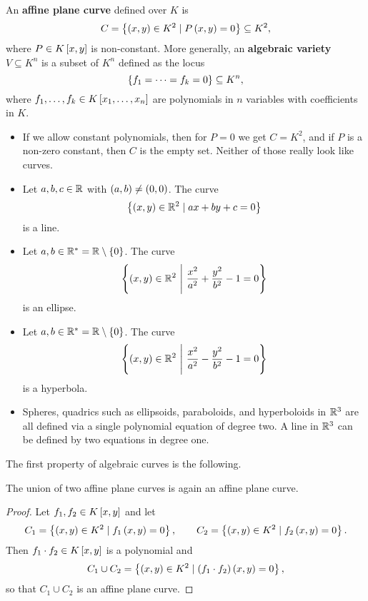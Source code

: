 \begin{definition}
An \textbf{affine plane curve} defined over $ K $ is
$$ C = \cb{\rb{x, y} \in K^2 \mid P\rb{x, y} = 0} \subseteq K^2, $$
where $ P \in K\sb{x, y} $ is non-constant. More generally, an \textbf{algebraic variety} $ V \subseteq K^n $ is a subset of $ K^n $ defined as the locus
$$ \cb{f_1 = \dots = f_k = 0} \subseteq K^n, $$
where $ f_1, \dots, f_k \in K\sb{x_1, \dots, x_n} $ are polynomials in $ n $ variables with coefficients in $ K $.
\end{definition}

\pagebreak

\begin{example}
\hfill
\begin{itemize}
\item If we allow constant polynomials, then for $ P = 0 $ we get $ C = K^2 $, and if $ P $ is a non-zero constant, then $ C $ is the empty set. Neither of those really look like curves.
\item Let $ a, b, c \in \R $ with $ \rb{a, b} \ne \rb{0, 0} $. The curve
$$ \cb{\rb{x, y} \in \R^2 \mid ax + by + c = 0} $$
is a line.
\item Let $ a, b \in \R^* = \R \setminus \cb{0} $. The curve
$$ \cb{\rb{x, y} \in \R^2 \ \Bigg| \ \dfrac{x^2}{a^2} + \dfrac{y^2}{b^2} - 1 = 0} $$
is an ellipse.
\item Let $ a, b \in \R^* = \R \setminus \cb{0} $. The curve
$$ \cb{\rb{x, y} \in \R^2 \ \Bigg| \ \dfrac{x^2}{a^2} - \dfrac{y^2}{b^2} - 1 = 0} $$
is a hyperbola.
\item Spheres, quadrics such as ellipsoids, paraboloids, and hyperboloids in $ \R^3 $ are all defined via a single polynomial equation of degree two. A line in $ \R^3 $ can be defined by two equations in degree one.
\end{itemize}
\end{example}

The first property of algebraic curves is the following.

\begin{lemma}
\label{lem:1.7}
The union of two affine plane curves is again an affine plane curve.
\end{lemma}

\begin{proof}
Let $ f_1, f_2 \in K\sb{x, y} $ and let
$$ C_1 = \cb{\rb{x, y} \in K^2 \mid f_1\rb{x, y} = 0}, \qquad C_2 = \cb{\rb{x, y} \in K^2 \mid f_2\rb{x, y} = 0}. $$
Then $ f_1 \cdot f_2 \in K\sb{x, y} $ is a polynomial and
$$ C_1 \cup C_2 = \cb{\rb{x, y} \in K^2 \mid \rb{f_1 \cdot f_2}\rb{x, y} = 0}, $$
so that $ C_1 \cup C_2 $ is an affine plane curve.
\end{proof}

